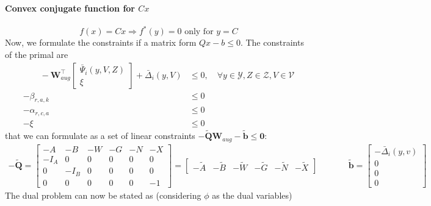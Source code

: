 \documentclass[10pt,letterpaper]{article}
\newcommand{\+}[1]{\ensuremath{{\boldsymbol #1}}}
\begin{document}
\paragraph{Convex conjugate function for $Cx$}
\begin{equation}
f(x) = Cx \Rightarrow f^*(y) = 0 \mbox{ only for } y=C
\end{equation}
Now, we formulate the constraints if a matrix form $Qx-b \le 0$. The constraints of the primal are
\begin{equation}
\begin{split} 
 \quad\quad -\+W_{aug}^\top\begin{bmatrix} \bar{\Psi}_i(y,V,Z) \\ \xi \end{bmatrix} + \bar{\Delta}_i(y,V) & \le 0, \quad \forall y \in \mathcal{Y}, Z \in \mathcal{Z}, V \in \mathcal{V} \\
-\beta_{r,a,k} & \le 0 \\
 -\alpha_{r,c,a} & \le 0 \\
 -\xi & \le 0
\end{split}
\end{equation}
that we can formulate as a set of linear constraints $-\tilde{\+Q}\+W_{aug}-\tilde{\+b}\le\+0$:
\begin{equation}
\begin{split}
-\tilde{\+Q} = \begin{bmatrix} -A & -B & -W & -G & -N & -X \\ -I_A & 0 & 0 & 0 & 0 & 0 \\ 0 & -I_B & 0 & 0 & 0 & 0 \\ 0 & 0 & 0 & 0 & 0 & -1\end{bmatrix} = \begin{bmatrix} -\tilde{A} & -\tilde{B} & -\tilde{W} & -\tilde{G} & -\tilde{N} & -\tilde{X} \end{bmatrix}
\end{split}
\begin{split}
\quad\quad
\end{split}
\begin{split}
\tilde{\+b} = \begin{bmatrix} -\bar\Delta_i(y,v) \\ 0 \\ 0 \\ 0 \end{bmatrix}
\end{split}
\end{equation}
The dual problem can now be stated as (considering $\phi$ as the dual variables)
\end{document}
